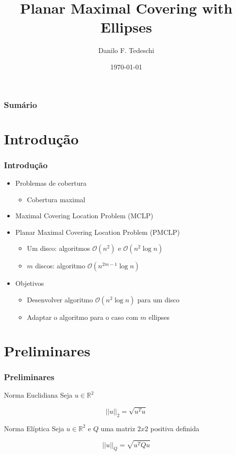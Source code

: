 \documentclass{beamer}
\title[Qualificação de Mestrado]{Planar Maximal Covering with Ellipses}
\author[Tedeschi, D. F.]{Danilo F. Tedeschi}
\institute[ICMC]{Instituto de Ciências Matemáticas e Computação}
\date{\today}
\newcommand{\R}{\mathbb{R}}
\newcommand{\bigO}{\mathscr{O}}
\begin{document}
\begin{frame}
 \maketitle
\end{frame}

\begin{frame}
\frametitle{Sumário}
 \tableofcontents
\end{frame}

\section{Introdução}
\begin{frame}
\frametitle{Introdução}
\begin{itemize}
	\item Problemas de cobertura
	\begin{itemize}
		\item Cobertura maximal
	\end{itemize}
	\item Maximal Covering Location Problem (MCLP)
	\item Planar Maximal Covering Location Problem (PMCLP)
	\begin{itemize}
	\item Um disco: algoritmos $\bigO(n^2)$ e $\bigO(n^2\log{n})$
	\item $m$ discos: algoritmo $\bigO(n^{2m-1}\log{n})$
	\end{itemize}
	\item Objetivos
	\begin{itemize}
		\item Desenvolver algoritmo $\bigO(n^2\log{n})$ para um disco
		\item Adaptar o algoritmo para o caso com $m$ ellipses
	\end{itemize}
\end{itemize}

\end{frame} 


\section{Preliminares}

\begin{frame}
	\frametitle{Preliminares}
	\begin{block}{Norma Euclidiana}
		Seja $u \in \R^2$
		
		\begin{equation*}
		||u||_2 = \sqrt{u^Tu}
		\end{equation*}
		
	\end{block}

\begin{block}{Norma Elíptica}
	Seja $u \in \R^2$ e $Q$ uma matriz $2x2$ positiva definida
	
	\begin{equation*}
	||u||_{Q} = \sqrt{u^TQu}
	\end{equation*}
\end{block}
\end{frame}
\end{document}
